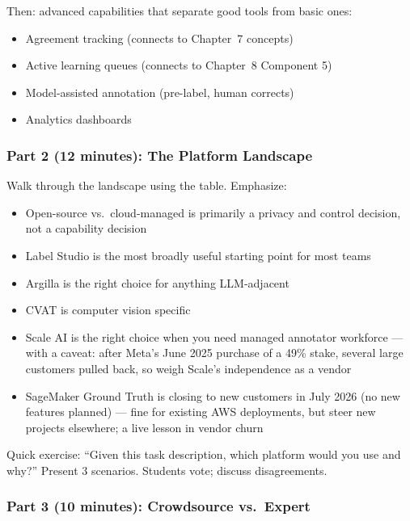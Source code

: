 Then: advanced capabilities that separate good tools from basic ones:
\begin{itemize}
    \item Agreement tracking (connects to Chapter~7 concepts)
    \item Active learning queues (connects to Chapter~8 Component 5)
    \item Model-assisted annotation (pre-label, human corrects)
    \item Analytics dashboards
\end{itemize}

\subsubsection{Part 2 (12 minutes): The Platform Landscape}

Walk through the landscape using the table. Emphasize:
\begin{itemize}
    \item Open-source vs.\ cloud-managed is primarily a privacy and control decision, not a capability decision
    \item Label Studio is the most broadly useful starting point for most teams
    \item Argilla is the right choice for anything LLM-adjacent
    \item CVAT is computer vision specific
    \item Scale AI is the right choice when you need managed annotator workforce --- with a caveat: after Meta's June 2025 purchase of a 49\% stake, several large customers pulled back, so weigh Scale's independence as a vendor
    \item SageMaker Ground Truth is closing to new customers in July 2026 (no new features planned) --- fine for existing AWS deployments, but steer new projects elsewhere; a live lesson in vendor churn
\end{itemize}

\begin{trythis}
Quick exercise: ``Given this task description, which platform would you use and why?'' Present 3 scenarios. Students vote; discuss disagreements.
\end{trythis}

\subsubsection{Part 3 (10 minutes): Crowdsource vs.\ Expert}

